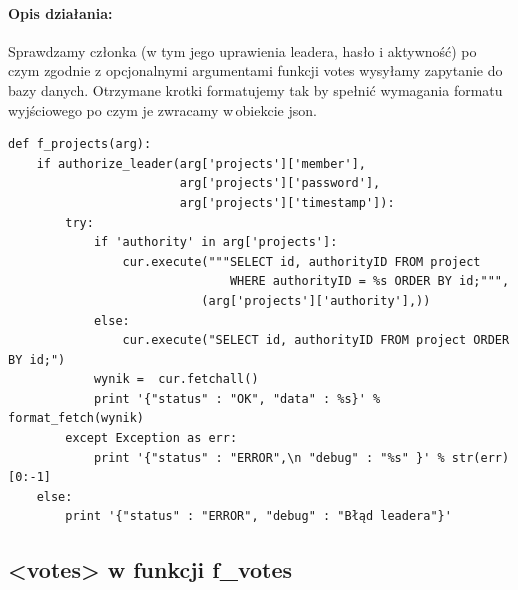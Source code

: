 \documentclass{article}
\begin{document}
\paragraph{Opis działania: }
Sprawdzamy członka (w tym jego uprawienia leadera, hasło i aktywność) po czym zgodnie z opcjonalnymi argumentami funkcji votes wysyłamy zapytanie do bazy danych.
Otrzymane krotki formatujemy tak by spełnić wymagania formatu wyjściowego po czym je zwracamy w\,obiekcie json. \newline
\begin{verbatim}
def f_projects(arg):
    if authorize_leader(arg['projects']['member'], 
                        arg['projects']['password'], 
                        arg['projects']['timestamp']):
        try:
            if 'authority' in arg['projects']:
                cur.execute("""SELECT id, authorityID FROM project 
                               WHERE authorityID = %s ORDER BY id;""",
                           (arg['projects']['authority'],))
            else:
                cur.execute("SELECT id, authorityID FROM project ORDER BY id;")
            wynik =  cur.fetchall()
            print '{"status" : "OK", "data" : %s}' % format_fetch(wynik)
        except Exception as err:
            print '{"status" : "ERROR",\n "debug" : "%s" }' % str(err)[0:-1]
    else:
        print '{"status" : "ERROR", "debug" : "Błąd leadera"}'  
\end{verbatim}







\newpage
\subsection{<votes> w funkcji f\_votes }
\end{document}
